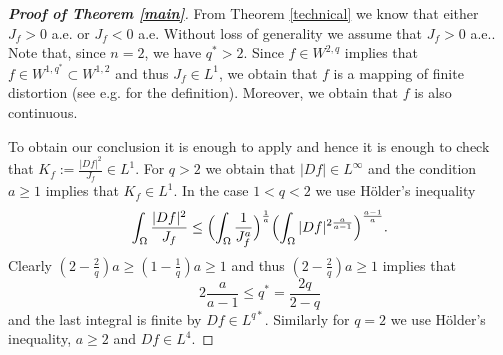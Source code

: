 \documentclass[12pt,a4paper]{amsart}
\theoremstyle{plain}
\newtheorem{corollary}[thm]{Corollary}
\theoremstyle{definition}
\numberwithin{equation}{section}
\def\epsilon{\varepsilon}
\newcommand{\RR}{\mathbb{R}}
\newcommand{\Om}{\Omega}
\newcommand{\komm}{\color{magenta}}
\newcommand{\ed}{\color{black}}
\begin{document}
    	
    
            \begin{proof}[\textbf{Proof of Theorem \ref{main}}]
    	From Theorem \ref{technical} we know that either $J_f>0$ a.e. or $J_f<0$ a.e. Without loss of generality we assume that $J_f>0$ a.e.. Note that, since $n=2$, we have $q^*>2$. 
    	Since $f\in W^{2,q}$ implies that $f\in W^{1,q^*}\subset W^{1,2}$ and thus $J_f\in L^1$, we obtain that $f$ is a mapping of finite distortion (see e.g. \cite{HK14} for the definition). Moreover, we obtain that $f$ is also continuous. %
    	
    	To obtain our conclusion it is enough to apply \cite[Theorem 2.5]{CHMS} and hence it is enough to check that  $K_f:=\frac{|Df|^2}{J_f}\in L^1$. 
    	For $q>2$ we obtain that $|Df|\in L^{\infty}$ and the condition $a\geq 1$ implies that $K_f\in L^1$. 
    	In the case $1<q<2$ we use H\"older's inequality 
    	$$
    	\int_{\Om} \frac{|Df|^2}{J_f}\leq \Bigl(\int_{\Om} \frac{1}{J_f^a}\Bigr)^{\frac{1}{a}}\Bigl(\int_{\Om} |Df|^{2\frac{a}{a-1}}\Bigr)^{\frac{a-1}{a}}.
    	$$
    	Clearly $(2-\frac{2}{q})a\geq (1-\frac{1}{q})a\geq 1$ and thus 
    	$(2-\frac{2}{q})a\geq 1$ implies that
    	$$
    	2\frac{a}{a-1}\leq q^*=\frac{2q}{2-q}
    	$$
    	and the last integral is finite by $Df\in L^{q*}$. Similarly for $q=2$ we use H\"older's inequality, $a\geq 2$ and $Df\in L^4$. 
    	
    \end{proof}
    
    
\end{document}
